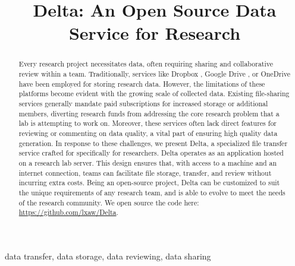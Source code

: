 \documentclass[conference]{IEEEtran}
\begin{document}
\title{
    Delta: An Open Source Data Service for Research
}

\author{
\and
{}
}

\maketitle

\begin{abstract}
Every research project necessitates data, often requiring sharing and collaborative review within a team. 
Traditionally, services like Dropbox \cite{dropbox}, Google Drive \cite{googledrive}, or OneDrive \cite{onedrive}  
have been employed for storing research data. However, the limitations of these platforms become evident with the growing 
scale of collected data. Existing file-sharing services generally mandate paid subscriptions for increased storage or additional members, 
diverting research funds from addressing the core research problem that a lab is attempting to work on. 
Moreover, these services often lack direct features for reviewing or 
commenting on data quality, a vital part of ensuring high quality data generation. 
In response to these challenges, we present Delta, a specialized file transfer service crafted for specifically for researchers. 
Delta operates as an application hosted on a research lab server. This design ensures that, with access to a machine and an internet connection, 
teams can facilitate file storage, transfer, and review without incurring extra costs. Being an open-source project, Delta can be customized to 
suit the unique requirements of any research team, and is able to evolve to meet the needs of the research community. We open source the code here: 
\href{https://github.com/lxaw/Delta}{https://github.com/lxaw/Delta}.

\end{abstract}

\begin{IEEEkeywords}
data transfer, data storage, data reviewing, data sharing
\end{IEEEkeywords}
\end{document}
